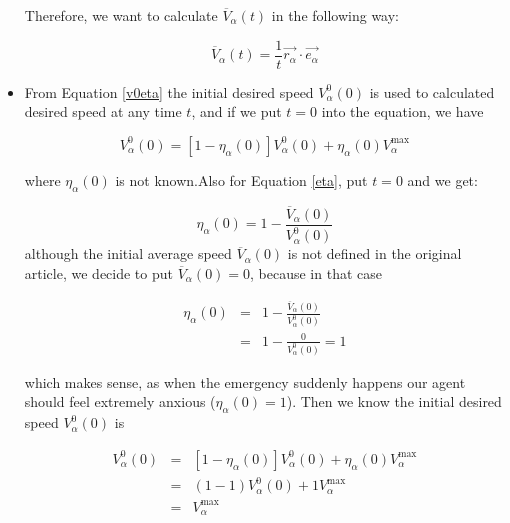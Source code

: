 \begin{itemize}
Therefore, we want to calculate $\overline{V}_{\alpha} \left( t \right)$ in the following way:

\begin{equation}\label{averagespeed}
   \overline{V}_{\alpha} \left( t \right) = \frac{1}{t} \vec{r_{\alpha}}\cdot \vec{e_{\alpha}} 
\end{equation}

\item From Equation \ref{v0eta} the initial desired speed $V_{\alpha}^{0} \left( 0 \right)$ is used 
to calculated desired speed at any time $ t $, and if we put $ t=0 $ into the equation, we have

\begin{equation}
    V_{\alpha}^{0}\left( 0 \right) = \left[ 1 - \eta_{\alpha} \left( 0 \right) \right] 
    V_{\alpha}^{0} \left( 0 \right) +
    \eta_{\alpha} \left( 0 \right)V_{\alpha}^{\text{max}}
\end{equation}

where $ \eta_{\alpha} \left( 0 \right) $ is not known.Also for Equation \ref{eta}, put $ t=0 $ and we get:

\begin{equation}
	\eta_{\alpha} \left( 0 \right) =
    1 - \frac{\overline{V}_{\alpha} \left( 0 \right)}
             {V_{\alpha}^{0} \left( 0 \right)}

\end{equation}
although the initial average speed $ \overline{V}_{\alpha} \left( 0 \right) $ is not defined in the original article, 
we decide to put $ \overline{V}_{\alpha} \left( 0 \right)=0 $, because in that case 

\begin{eqnarray}
	\eta_{\alpha} \left( 0 \right) &=&
    1 - \frac{\overline{V}_{\alpha} \left( 0 \right)}
             {V_{\alpha}^{0} \left( 0 \right)}\\
&=& 1 - \frac{0}{V_{\alpha}^{0} \left( 0 \right)}
= 1
\end{eqnarray}

which makes sense, as when the emergency suddenly happens our agent should feel extremely anxious 
($ \eta_{\alpha} \left( 0 \right)=1 $). Then we know the initial desired speed $ V_{\alpha}^{0}\left( 0 \right) $ is

\begin{eqnarray}
    V_{\alpha}^{0}\left( 0 \right) &=& \left[ 1 - \eta_{\alpha} \left( 0 \right) \right] 
    V_{\alpha}^{0} \left( 0 \right) +
    \eta_{\alpha} \left( 0 \right)V_{\alpha}^{\text{max}}\\
&=& \left( 1 - 1 \right)  
    V_{\alpha}^{0} \left( 0 \right) +
    1 V_{\alpha}^{\text{max}}\\
&=& V_{\alpha}^{\text{max}}
\end{eqnarray}


\end{itemize}

